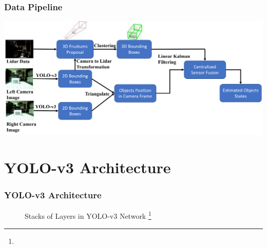 \documentclass[10pt]{beamer}
\begin{document}
\begin{frame}
\frametitle{Data Pipeline}
\centering
\includegraphics[width = 1\textwidth]{Images/Datapipeline.png}
\end{frame}


\section{YOLO-v3 Architecture}

\begin{frame}
\frametitle{YOLO-v3 Architecture}

\begin{figure}
    \centering
    \caption{Stacks of Layers in YOLO-v3 Network \footnote[frame]{}}
\end{figure}

\end{frame}
\end{document}
